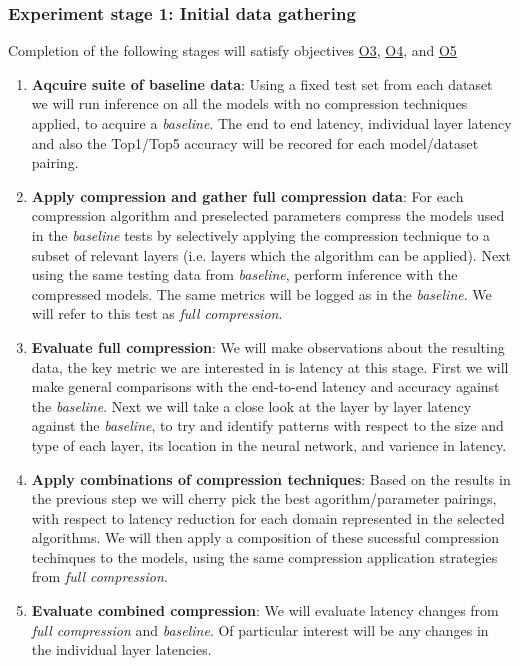 \documentclass[../D1.tex]{subfiles}
\begin{document}
\subsubsection{Experiment stage 1: Initial data gathering}\label{sec:Experiment1}
Completion of the following stages will satisfy objectives \hyperref[obj:EvalComp]{O3}, \hyperref[obj:EvalLayer]{O4}, and \hyperref[obj:EvalComp]{O5}
\begin{enumerate}
    \item \textbf{Aqcuire suite of baseline data}: Using a fixed test set from each dataset we will run inference on all the models with no compression techniques applied, to acquire a \emph{baseline}. The end to end latency, individual layer latency and also the Top1/Top5 accuracy will be recored for each model/dataset pairing.
    \item \textbf{Apply compression and gather full compression data}: For each compression algorithm and preselected parameters compress the models used in the \emph{baseline} tests by selectively applying the compression technique to a subset of relevant layers (i.e. layers which the algorithm can be applied). Next using the same testing data from \emph{baseline}, perform inference with the compressed models. The same metrics will be logged as in the \emph{baseline}. We will refer to this test as \emph{full compression}.
    \item \textbf{Evaluate full compression}: We will make observations about the resulting data, the key metric we are interested in is latency at this stage. First we will make general comparisons with the end-to-end latency and accuracy against the \emph{baseline}. Next we will take a close look at the layer by layer latency against the \emph{baseline}, to try and identify patterns with respect to the size and type of each layer, its location in the neural network, and varience in latency. 
    \item \textbf{Apply combinations of compression techniques}: Based on the results in the previous step we will cherry pick the best agorithm/parameter pairings, with respect to latency reduction for each domain represented in the selected algorithms. We will then apply a composition of these sucessful compression techinques to the models, using the same compression application strategies from \emph{full compression}.
    \item \textbf{Evaluate combined compression}: We will evaluate latency changes from \emph{full compression} and \emph{baseline}. Of particular interest will be any changes in the individual layer latencies.
\end{enumerate}
\end{document}
